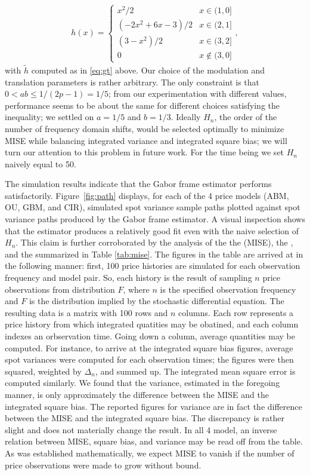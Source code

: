 \begin{align}
  h(x) = \left\{
    \begin{array}{lr}
    x^2/2 & x \in (1,0]\\
  (-2x^2 + 6x - 3)/2 & x \in (2,1]\\
(3-x^2)/2 & x \in (3,2]\\
0 & x \not\in (3,0]
\end{array}\right. ,
  \label{eq:theh}
\end{align}
with  $\tilde{h}$ computed as in \eqref{eq:gt} above.
Our choice of the modulation and translation parameters is rather arbitrary. The only constraint is that $0 < ab \le 1/(2p -1) = 1/5$; from our experimentation with different values, performance seems to be about the same for different choices satisfying the inequality;  we settled on $a = 1/5$ and $b = 1/3$.  Ideally $H_n$, the order of the number of frequency domain shifts, would be selected optimally to minimize MISE while balancing integrated variance and integrated square  bias; we will turn our attention to this problem in future work. For the time being we  set $H_n$ naively equal to 50.

The simulation results indicate that the Gabor frame estimator performs satisfactorily. Figure~\ref{fig:path} displays, for each of the 4 price models (ABM, OU, GBM, and CIR), simulated  spot variance sample paths plotted against spot variance paths produced by the Gabor frame estimator.  A visual inspection shows that the estimator produces a relatively good fit even with the naive selection of $H_n$. This claim is further corroborated by the analysis of the the \mise (MISE), the \isqb, and the \ivar summarized in Table \ref{tab:mise}. 
The figures in the table are arrived at in the following manner: first,  100 price histories are simulated for each observation frequency and  model pair.  So, each history is the result of sampling $n$ price observations from  distribution $F$, where $n$ is the specified observation frequency and $F$ is the distribution implied by the stochastic differential equation. The resulting data is a matrix with 100 rows and $n$ columns.  Each row represents a price history from which integrated quatities may be obatined, and each column indexes an orbservation time. Going down a column, average quantities may be computed. 
For instance, to arrive at the integrated square bias figures, average spot variances were computed for each observation times; the figures were then squared, weighted by $\Delta_n$, and summed up. The integrated mean square error is computed similarly.
 We found that the variance, estimated in the foregoing manner,  is only approximately the difference between the MISE and the integrated square bias.  The reported figures for variance are  in fact the difference between the MISE and the integrated square bias. The discrepancy is rather slight and does not materially change the result. In all 4 model, an inverse relation between MISE, square bias, and variance may be read off from the table. As was established mathematically, we expect MISE to vanish if the number of price observations were made to grow without bound.    
